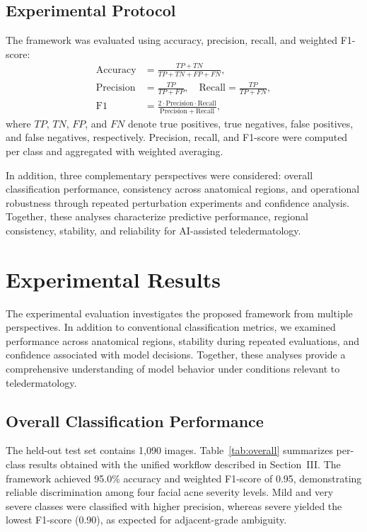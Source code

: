 \documentclass[conference]{IEEEtran}
\begin{document}
\subsection{Experimental Protocol}
The framework was evaluated using accuracy, precision, recall, and weighted F1-score:
\begin{align}
\mathrm{Accuracy} &= \frac{TP+TN}{TP+TN+FP+FN}, \\
\mathrm{Precision} &= \frac{TP}{TP+FP}, \quad
\mathrm{Recall} = \frac{TP}{TP+FN}, \\
\mathrm{F1} &= \frac{2\cdot \mathrm{Precision}\cdot \mathrm{Recall}}{\mathrm{Precision}+\mathrm{Recall}},
\end{align}
where $TP$, $TN$, $FP$, and $FN$ denote true positives, true negatives, false positives, and false negatives, respectively. Precision, recall, and F1-score were computed per class and aggregated with weighted averaging.

In addition, three complementary perspectives were considered: overall classification performance, consistency across anatomical regions, and operational robustness through repeated perturbation experiments and confidence analysis. Together, these analyses characterize predictive performance, regional consistency, stability, and reliability for AI-assisted teledermatology.

\section{Experimental Results}
The experimental evaluation investigates the proposed framework from multiple perspectives. In addition to conventional classification metrics, we examined performance across anatomical regions, stability during repeated evaluations, and confidence associated with model decisions. Together, these analyses provide a comprehensive understanding of model behavior under conditions relevant to teledermatology.

\subsection{Overall Classification Performance}
The held-out test set contains 1,090 images. Table~\ref{tab:overall} summarizes per-class results obtained with the unified workflow described in Section~III. The framework achieved 95.0\% accuracy and weighted F1-score of 0.95, demonstrating reliable discrimination among four facial acne severity levels. Mild and very severe classes were classified with higher precision, whereas severe yielded the lowest F1-score (0.90), as expected for adjacent-grade ambiguity.
\end{document}
